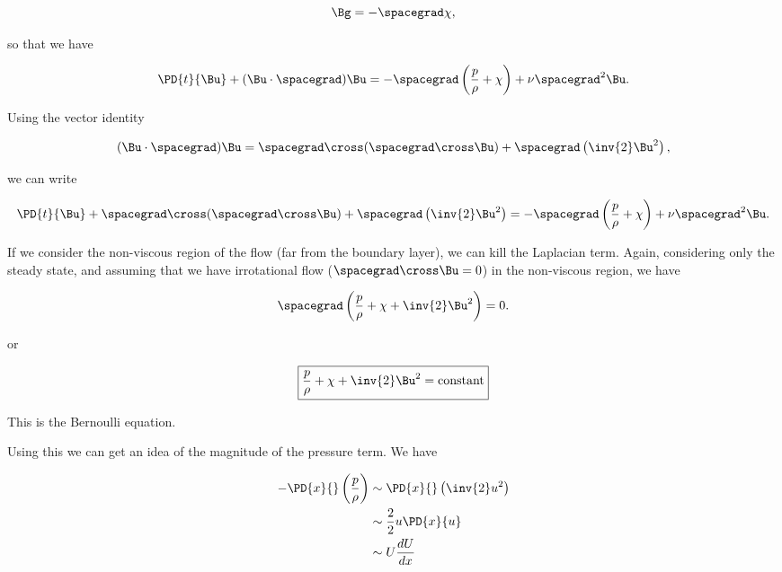 \begin{equation}\label{eqn:continuumL18:310}
\Bg = -\spacegrad \chi,
\end{equation}

so that we have

\begin{equation}\label{eqn:continuumL18:330}
\PD{t}{\Bu} + (\Bu \cdot \spacegrad) \Bu = -\spacegrad \left( \frac{p}{\rho} + \chi \right) + \nu \spacegrad^2 \Bu .
\end{equation}

Using the vector identity

\begin{equation}\label{eqn:continuumL18:350}
(\Bu \cdot \spacegrad) \Bu = \spacegrad \cross (\spacegrad \cross \Bu) + \spacegrad \left( \inv{2} \Bu^2 \right),
\end{equation}

we can write

\begin{equation}\label{eqn:continuumL18:370}
\PD{t}{\Bu} + 
\spacegrad \cross (\spacegrad \cross \Bu) + \spacegrad \left( \inv{2} \Bu^2 \right)
= -\spacegrad \left( \frac{p}{\rho} + \chi \right) + \nu \spacegrad^2 \Bu .
\end{equation}

If we consider the non-viscous region of the flow (far from the boundary layer), we can kill the Laplacian term.  Again, considering only the steady state, and assuming that we have irrotational flow ($\spacegrad \cross \Bu = 0$) in the non-viscous region, we have

\begin{equation}\label{eqn:continuumL18:390}
\spacegrad \left( \frac{p}{\rho} + \chi + \inv{2} \Bu^2 \right) = 0.
\end{equation}

or

\begin{equation}\label{eqn:continuumL18:410}
\boxed{
\frac{p}{\rho} + \chi + \inv{2} \Bu^2 = \text{constant}
}
\end{equation}

This is the Bernoulli equation.

Using this we can get an idea of the magnitude of the pressure term.  We have 

\begin{align*}
- \PD{x}{} \left( \frac{p}{\rho} \right) 
&\sim \PD{x}{} \left( \inv{2} u^2 \right) \\
&\sim \frac{2}{2} u \PD{x}{u} \\
&\sim U \frac{dU}{dx}
\end{align*}

